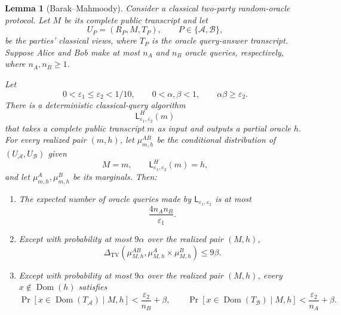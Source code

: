 \documentclass[11pt]{article}
\newcounter{algorithm}
\newtheorem{lemma}[lemma]{Lemma}
\newcommand{\cA}{\mathcal{A}}
\newcommand{\cB}{\mathcal{B}}
\newcommand{\Dom}{\operatorname{Dom}}
\begin{document}
\begin{lemma}[Barak--Mahmoody]
\label{lem:bm-final-transcript}
Consider a classical two-party random-oracle protocol.  Let $M$ be its complete
public transcript and let
\[
  U_P=(R_P,M,T_P),\qquad P\in\{\cA,\cB\},
\]
be the parties' classical views, where $T_P$ is the oracle query-answer
transcript.  Suppose Alice and Bob make at most $n_A$ and $n_B$ oracle
queries, respectively, where $n_A,n_B\ge1$.

Let
\[
  0<\varepsilon_1\le\varepsilon_2<1/10,
  \qquad
  0<\alpha,\beta<1,
  \qquad
  \alpha\beta\ge\varepsilon_2.
\]
There is a deterministic classical-query algorithm
\[
  \mathsf L^H_{\varepsilon_1,\varepsilon_2}(m)
\]
that takes a complete public transcript $m$ as input and outputs a partial
oracle $h$.  For every realized pair $(m,h)$, let $\mu^{AB}_{m,h}$ be the
conditional distribution of $(U_{\cA},U_{\cB})$ given
\[
  M=m,
  \qquad
  \mathsf L^H_{\varepsilon_1,\varepsilon_2}(m)=h,
\]
and let $\mu^A_{m,h},\mu^B_{m,h}$ be its marginals.  Then:
\begin{enumerate}[leftmargin=2em,label=\textup{(\roman*)}]
  \item The expected number of oracle queries made by
  $\mathsf L_{\varepsilon_1,\varepsilon_2}$ is at most
  \[
    \frac{4n_A n_B}{\varepsilon_1}.
  \]

  \item Except with probability at most $9\alpha$ over the realized pair
  $(M,h)$,
  \[
    \Delta_{\mathrm{TV}}\!\left(
      \mu^{AB}_{M,h},
      \mu^A_{M,h}\times\mu^B_{M,h}
    \right)
    \le 9\beta.
  \]

  \item Except with probability at most $9\alpha$ over the realized pair
  $(M,h)$, every $x\notin\Dom(h)$ satisfies
  \[
    \Pr[x\in\Dom(T_{\cA})\mid M,h]
      < \frac{\varepsilon_2}{n_B}+\beta,
    \qquad
    \Pr[x\in\Dom(T_{\cB})\mid M,h]
      < \frac{\varepsilon_2}{n_A}+\beta.
  \]
\end{enumerate}
\end{lemma}
\end{document}
